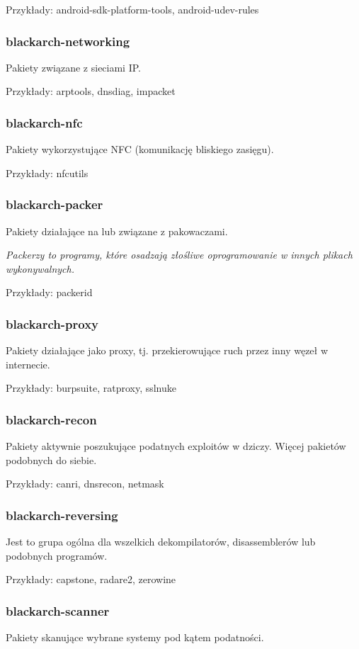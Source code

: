 \documentclass[a4paper, oneside, 11pt]{book}
\begin{document}
Przykłady: android-sdk-platform-tools, android-udev-rules

\subsubsection{blackarch-networking}
Pakiety związane z sieciami IP.

Przykłady: arptools, dnsdiag, impacket

\subsubsection{blackarch-nfc}
Pakiety wykorzystujące NFC (komunikację bliskiego zasięgu).

Przykłady: nfcutils

\subsubsection{blackarch-packer}
Pakiety działające na lub związane z pakowaczami.

\textit{Packerzy to programy, które osadzają złośliwe oprogramowanie w innych plikach wykonywalnych.}

Przykłady: packerid

\subsubsection{blackarch-proxy}
Pakiety działające jako proxy, tj. przekierowujące ruch przez inny węzeł w internecie.

Przykłady: burpsuite, ratproxy, sslnuke

\subsubsection{blackarch-recon}
Pakiety aktywnie poszukujące podatnych exploitów w dziczy. Więcej pakietów podobnych do siebie.

Przykłady: canri, dnsrecon, netmask

\subsubsection{blackarch-reversing}
Jest to grupa ogólna dla wszelkich dekompilatorów, disassemblerów lub podobnych programów.

Przykłady: capstone, radare2, zerowine

\subsubsection{blackarch-scanner}
Pakiety skanujące wybrane systemy pod kątem podatności.
\end{document}
